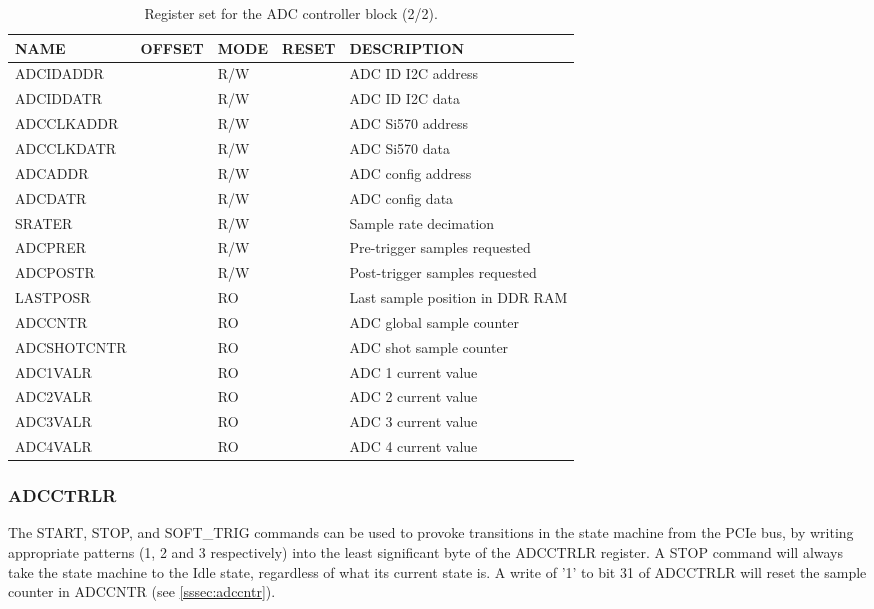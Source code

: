 \documentclass{article}
\begin{document}
\begin{table}[htbp]
  \centering
  \begin{tabularx}{\textwidth}{|l|r|l|l|X|}
    \hline
    \textbf{NAME} & \textbf{OFFSET} & \textbf{MODE} & \textbf{RESET} & \textbf{DESCRIPTION} \\
    \hline
    \hline
    ADCIDADDR & & R/W & & ADC ID I2C address \\
    \hline
    ADCIDDATR & & R/W & & ADC ID I2C data \\
    \hline
    ADCCLKADDR & & R/W & & ADC Si570 address \\
    \hline
    ADCCLKDATR & & R/W & & ADC Si570 data \\
    \hline
    ADCADDR & & R/W & & ADC config address \\
    \hline
    ADCDATR & & R/W & & ADC config data \\
    \hline
    SRATER & & R/W & & Sample rate decimation \\
    \hline
    ADCPRER & & R/W & & Pre-trigger samples requested \\
    \hline
    ADCPOSTR & & R/W & & Post-trigger samples requested \\
    \hline
    LASTPOSR & & RO & & Last sample position in DDR RAM\\
    \hline
    ADCCNTR & & RO & & ADC global sample counter \\
    \hline
    ADCSHOTCNTR & & RO & & ADC shot sample counter \\
    \hline
    ADC1VALR & & RO & & ADC 1 current value \\
    \hline
    ADC2VALR & & RO & & ADC 2 current value \\
    \hline
    ADC3VALR & & RO & & ADC 3 current value \\
    \hline
    ADC4VALR & & RO & & ADC 4 current value \\
    \hline
  \end{tabularx}
  \caption{Register set for the ADC controller block (2/2).}
  \label{tab:adc_control2}
\end{table}

\subsubsection{ADCCTRLR}
The START, STOP, and SOFT\_TRIG commands can be used to provoke transitions in the state machine from the PCIe bus, by writing appropriate patterns (1, 2 and 3 respectively) into the least significant byte of the ADCCTRLR register. A STOP command will always take the state machine to the Idle state, regardless of what its current state is. A write of '1' to bit 31 of ADCCTRLR will reset the sample counter in ADCCNTR (see \ref{sssec:adccntr}).
\end{document}
